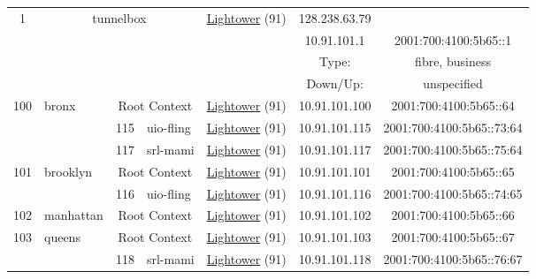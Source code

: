 \begin{small}
\begin{center}
\begin{longtable}{|c|c|c|c|c|c|c|c|}
 \multirow{4}{*}{\tiny{1}} & \multicolumn{3}{|c|}{\multirow{4}{*}{\tiny{tunnelbox}}} & \multicolumn{2}{|c|}{\multirow{4}{*}{\tiny{\href{http://www.lightower.com}{Lightower} (91)}}} & \tiny{128.238.63.79} & \frownie{} \\* \cline{7-7}\cline{8-8}
  & \multicolumn{3}{|c|}{} & \multicolumn{2}{|c|}{} & \tiny{10.91.101.1} & \tiny{2001:700:4100:5b65::1} \\* \cline{7-7}\cline{8-8}
  & \multicolumn{3}{|c|}{} & \multicolumn{2}{|c|}{} & Type: & fibre, business \\* \cline{7-7}\cline{8-8}
  & \multicolumn{3}{|c|}{} & \multicolumn{2}{|c|}{} & Down/Up:  & unspecified \\ \hline
 \multirow{3}{*}{\tiny{100}} & \multicolumn{1}{|l|}{\multirow{3}{*}{\tiny{bronx}}} & \multicolumn{2}{|c|}{\tiny{Root Context}} & \multicolumn{2}{|c|}{\tiny{\href{http://www.lightower.com}{Lightower} (91)}} & \tiny{10.91.101.100} & \tiny{2001:700:4100:5b65::64} \\* \cline{3-3}\cline{4-4}\cline{5-5}\cline{6-6}\cline{7-7}\cline{8-8}
  &  & \tiny{115} & \multicolumn{1}{|l|}{\tiny{uio-fling}} & \multicolumn{2}{|c|}{\tiny{\href{http://www.lightower.com}{Lightower} (91)}} & \tiny{10.91.101.115} & \tiny{2001:700:4100:5b65::73:64} \\* \cline{3-3}\cline{4-4}\cline{5-5}\cline{6-6}\cline{7-7}\cline{8-8}
  &  & \tiny{117} & \multicolumn{1}{|l|}{\tiny{srl-mami}} & \multicolumn{2}{|c|}{\tiny{\href{http://www.lightower.com}{Lightower} (91)}} & \tiny{10.91.101.117} & \tiny{2001:700:4100:5b65::75:64} \\ \hline
 \multirow{2}{*}{\tiny{101}} & \multicolumn{1}{|l|}{\multirow{2}{*}{\tiny{brooklyn}}} & \multicolumn{2}{|c|}{\tiny{Root Context}} & \multicolumn{2}{|c|}{\tiny{\href{http://www.lightower.com}{Lightower} (91)}} & \tiny{10.91.101.101} & \tiny{2001:700:4100:5b65::65} \\* \cline{3-3}\cline{4-4}\cline{5-5}\cline{6-6}\cline{7-7}\cline{8-8}
  &  & \tiny{116} & \multicolumn{1}{|l|}{\tiny{uio-fling}} & \multicolumn{2}{|c|}{\tiny{\href{http://www.lightower.com}{Lightower} (91)}} & \tiny{10.91.101.116} & \tiny{2001:700:4100:5b65::74:65} \\ \hline
 \tiny{102} & \multicolumn{1}{|l|}{\tiny{manhattan}} & \multicolumn{2}{|c|}{\tiny{Root Context}} & \multicolumn{2}{|c|}{\tiny{\href{http://www.lightower.com}{Lightower} (91)}} & \tiny{10.91.101.102} & \tiny{2001:700:4100:5b65::66} \\ \hline
 \multirow{2}{*}{\tiny{103}} & \multicolumn{1}{|l|}{\multirow{2}{*}{\tiny{queens}}} & \multicolumn{2}{|c|}{\tiny{Root Context}} & \multicolumn{2}{|c|}{\tiny{\href{http://www.lightower.com}{Lightower} (91)}} & \tiny{10.91.101.103} & \tiny{2001:700:4100:5b65::67} \\* \cline{3-3}\cline{4-4}\cline{5-5}\cline{6-6}\cline{7-7}\cline{8-8}
  &  & \tiny{118} & \multicolumn{1}{|l|}{\tiny{srl-mami}} & \multicolumn{2}{|c|}{\tiny{\href{http://www.lightower.com}{Lightower} (91)}} & \tiny{10.91.101.118} & \tiny{2001:700:4100:5b65::76:67} \\ \hline
\end{longtable}
\end{center}
\end{small}
